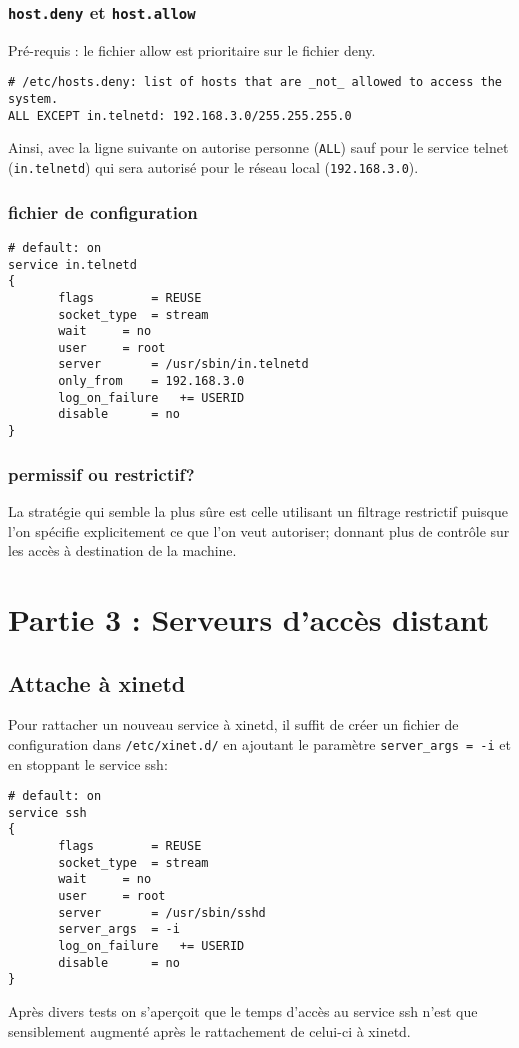 \documentclass[12pt,a4paper,notitlepage]{article}
\begin{document}
\subsubsection{\texttt{host.deny} et \texttt{host.allow}}

\noindent Pré-requis : le fichier allow est prioritaire sur le fichier deny.\\

\begin{lstlisting}
# /etc/hosts.deny: list of hosts that are _not_ allowed to access the system.
ALL EXCEPT in.telnetd: 192.168.3.0/255.255.255.0
\end{lstlisting}
Ainsi, avec la ligne suivante on autorise personne (\texttt{ALL}) sauf pour le service telnet (\texttt{in.telnetd}) qui sera autorisé pour le réseau local (\texttt{192.168.3.0}).


\subsubsection{fichier de configuration}

\begin{lstlisting}
# default: on
service in.telnetd
{
       flags		= REUSE
       socket_type	= stream
       wait		= no
       user		= root
       server		= /usr/sbin/in.telnetd
       only_from	= 192.168.3.0
       log_on_failure	+= USERID
       disable		= no
}
\end{lstlisting}

\subsubsection{permissif ou restrictif?}



La stratégie qui semble la plus sûre est celle utilisant un filtrage restrictif puisque l'on spécifie explicitement ce que l'on veut autoriser; donnant plus de contrôle sur les accès à destination de la machine.


\section{Partie 3 : Serveurs d'accès distant}

\subsection{Attache à xinetd}

Pour rattacher un nouveau service à xinetd, il suffit de créer un fichier de configuration dans \texttt{/etc/xinet.d/} en ajoutant le paramètre \texttt{server\_args = -i} et en stoppant le service ssh: \\

\begin{lstlisting}
# default: on
service ssh
{
       flags		= REUSE
       socket_type	= stream
       wait		= no
       user		= root
       server		= /usr/sbin/sshd
       server_args	= -i
       log_on_failure	+= USERID
       disable		= no
}
\end{lstlisting}

Après divers tests on s'aperçoit que le temps d'accès au service ssh n'est que sensiblement augmenté après le rattachement de celui-ci à xinetd.
\end{document}
